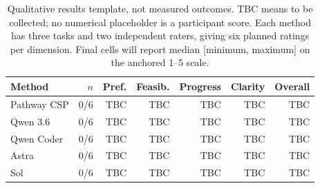 \begin{table}[htbp]\centering
\begin{tabular}{@{}lrrrrrr@{}}\toprule
Method & $n$ & Pref. & Feasib. & Progress & Clarity & Overall\\\midrule
Pathway CSP & 0/6 & TBC & TBC & TBC & TBC & TBC \\
Qwen 3.6 & 0/6 & TBC & TBC & TBC & TBC & TBC \\
Qwen Coder & 0/6 & TBC & TBC & TBC & TBC & TBC \\
Astra & 0/6 & TBC & TBC & TBC & TBC & TBC \\
Sol & 0/6 & TBC & TBC & TBC & TBC & TBC \\
\bottomrule\end{tabular}
\caption{Qualitative results template, not measured outcomes. TBC means to be collected; no numerical placeholder is a participant score. Each method has three tasks and two independent raters, giving six planned ratings per dimension. Final cells will report median [minimum, maximum] on the anchored 1--5 scale.}\label{tab:qualitative}
\end{table}
